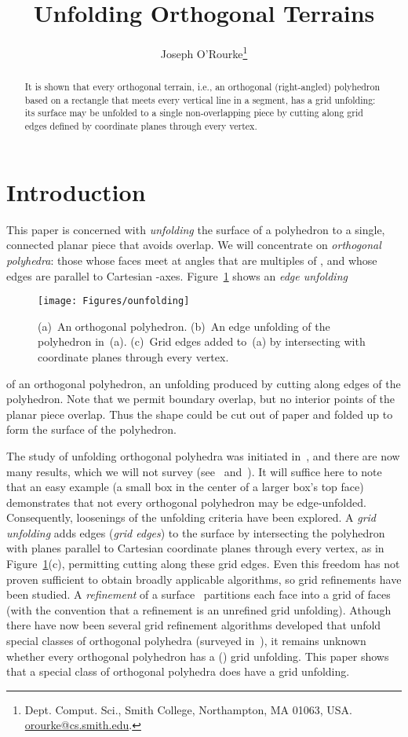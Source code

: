 \pdfoutput=1  \documentclass[]{article}
\title{Unfolding Orthogonal Terrains}
\author{Joseph O'Rourke\thanks{Dept. Comput. Sci., Smith College, Northampton, MA
      01063, USA.
      \protect\url{orourke@cs.smith.edu}.}
}
\newcommand{\figlab}[1]{\label{fig:#1}}
\newcommand{\figref}[1]{\ref{fig:#1}}
\begin{document}
\maketitle

\begin{abstract}
It is shown that every orthogonal terrain, i.e., an orthogonal (right-angled)
polyhedron based on a rectangle that meets every vertical line in a segment,
has a grid unfolding: its surface may be unfolded to a single non-overlapping piece
by cutting along grid edges defined by coordinate planes through every vertex.
\end{abstract}

\section{Introduction}
This paper is concerned with \emph{unfolding} the surface of a polyhedron
to a single, connected planar piece that avoids overlap.
We will concentrate on 
\emph{orthogonal polyhedra}: those whose faces meet at angles
that are multiples of , and whose edges are parallel to
Cartesian -axes.
Figure~\figref{ounfolding} shows an \emph{edge unfolding}
\begin{figure}[htbp]
\centering
\texttt{[image: Figures/ounfolding]}
\caption{(a)~An orthogonal polyhedron.
(b)~An edge unfolding of the polyhedron in~(a).
(c)~Grid edges added to~(a) by intersecting with coordinate planes
through every vertex.}
\figlab{ounfolding}
\end{figure}
of an orthogonal polyhedron, an unfolding produced by cutting
along edges of the polyhedron.
Note that we permit boundary overlap, but no interior points of
the planar piece overlap.
Thus the shape could be cut out of paper and folded up to form the 
surface of the polyhedron.

The study of unfolding orthogonal polyhedra was
initiated in~\cite{bddloorw-uscop-98}, and there are now many
results, which we will not survey 
(see~\cite{o-uop-07} and~\cite{do-gfalop-07}).
It will suffice here to note that an easy example (a small box in
the center of a larger box's top face) demonstrates that
not every orthogonal polyhedron may be edge-unfolded.
Consequently, 
loosenings of the unfolding criteria
have been explored.
A \emph{grid unfolding} adds edges 
(\emph{grid edges}) 
to the surface by intersecting the polyhedron
with planes parallel to Cartesian coordinate planes through every
vertex, as in
Figure~\figref{ounfolding}(c), permitting cutting along these
grid edges.
Even this freedom has not proven sufficient to obtain broadly
applicable algorithms, so
grid refinements have been studied.
A  \emph{refinement} of a surface~\cite{do-op04-05}
partitions each face into a  grid of faces
(with the convention that a
 refinement is an unrefined grid unfolding).
Athough there have now been several grid refinement algorithms
developed that unfold special classes of orthogonal polyhedra
(surveyed in~\cite{o-uop-07}),
it remains unknown whether every orthogonal polyhedron has
a () grid unfolding.
This paper shows that a special class of orthogonal polyhedra
does have a grid unfolding.
\end{document}

